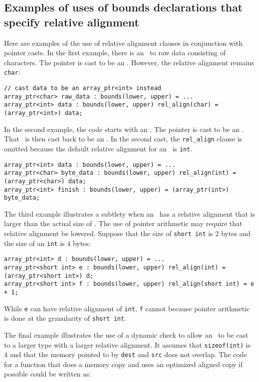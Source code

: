 \subsection{Examples of uses of bounds declarations that specify relative alignment}

Here are examples of the use of relative alignment clauses in
conjunction with pointer casts. In the first example, there is an
\arrayptr\ to raw data consisting of characters. The pointer is
cast to be an \arrayptrint . However,
the relative alignment remains \texttt{char}:

\begin{verbatim}
// cast data to be an array_ptr<int> instead
array_ptr<char> raw_data : bounds(lower, upper) = ...
array_ptr<int> data : bounds(lower, upper) rel_align(char) = (array_ptr<int>) data;
\end{verbatim}

In the second example, the code starts with an
\arrayptrint. The pointer is cast to
be an \arrayptrchar. That
\arrayptr\ is then cast back to be an
\arrayptrint . In the second cast, the
\texttt{rel\_align} clause is omitted because the default relative
alignment for an \arrayptrint\ is
\texttt{int}.

\begin{verbatim}
array_ptr<int> data : bounds(lower, upper) = ...
array_ptr<char> byte_data : bounds(lower, upper) rel_align(int) = (array_ptr<char>) data;
array_ptr<int> finish : bounds(lower, upper) = (array_ptr(int>) byte_data;
\end{verbatim}

The third example illustrates a subtlety when an
\arrayptrT\ has a
relative alignment that is larger than the actual size of . The
use of pointer arithmetic may require that relative alignment be
lowered. Suppose that the size of \texttt{short int} is 2 bytes and the
size of an \texttt{int} is 4 bytes:

\begin{verbatim}
array_ptr<int> d : bounds(lower, upper) = ...
array_ptr<short int> e : bounds(lower, upper) rel_align(int) = (array_ptr<short int>) d;
array_ptr<short int> f : bounds(lower, upper) rel_align(short int) = e + 1;
\end{verbatim}

While \texttt{e} can have relative alignment of \texttt{int}, \texttt{f}
cannot because pointer arithmetic is done at the granularity of
\texttt{short int}.

The final example illustrates the use of a dynamic check to allow an
\arrayptrchar\ to be cast to a larger
type with a larger relative alignment. It assumes that
\texttt{sizeof(int)} is 4 and that the memory pointed to by
\texttt{dest} and \texttt{src} does not overlap. The code for a function
that does a memory copy and uses an optimized aligned copy if possible
could be written as:

